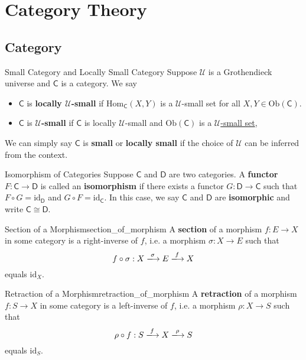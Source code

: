 
\chapter{Category Theory}
\section{Category}
\begin{definition}{Small Category and Locally Small Category}{}
    Suppose $\mathscr{U}$ is a Grothendieck universe and $\mathsf{C}$ is a category. We say
    \begin{itemize}
        \item $\mathsf{C}$ is \textbf{locally $\mathscr{U}$-small} if $\mathrm{Hom}_{\mathsf{C}}(X,Y)$ is a $\mathscr{U}$-small set for all $X,Y\in \mathrm{Ob}(\mathsf{C})$.
        \item $\mathsf{C}$ is \textbf{$\mathscr{U}$-small} if $\mathsf{C}$ is locally $\mathscr{U}$-small and $\mathrm{Ob}(\mathsf{C})$ is a \hyperref[th:small_set]{$\mathscr{U}$-small set},
    \end{itemize}
    We can simply say $\mathsf{C}$ is \textbf{small} or \textbf{locally small} if the choice of $\mathscr{U}$ can be inferred from the context.
\end{definition}

\begin{definition}{Isomorphism of Categories}{}
    Suppose $\mathsf{C}$ and $\mathsf{D}$ are two categories. A \textbf{functor} $F:\mathsf{C}\to \mathsf{D}$ is called an \textbf{isomorphism} if there exists a functor $G:\mathsf{D}\to \mathsf{C}$ such that $F\circ G=\mathrm{id}_{\mathsf{D}}$ and $G\circ F=\mathrm{id}_{\mathsf{C}}$. In this case, we say $\mathsf{C}$ and $\mathsf{D}$ are \textbf{isomorphic} and write $\mathsf{C}\cong \mathsf{D}$.
\end{definition}

\begin{definition}{Section of a Morphism}{section_of_morphism}
    A \textbf{section} of a morphism $f: E \rightarrow X$ in some category is a right-inverse of $f$, i.e. a morphism $\sigma: X \rightarrow E$ such that
    $$
    f \circ \sigma: X \xlongrightarrow{\sigma} E \xlongrightarrow{f} X
    $$
    equals $\mathrm{id}_X$.
\end{definition}

\begin{definition}{Retraction of a Morphism}{retraction_of_morphism}
    A \textbf{retraction} of a morphism $f: S\rightarrow X$ in some category is a left-inverse of $f$, i.e. a morphism $\rho: X \rightarrow S$ such that
    $$
    \rho \circ f: S \xlongrightarrow{f} X \xlongrightarrow{\rho} S
    $$
    equals $\mathrm{id}_S$.
    \end{definition}



